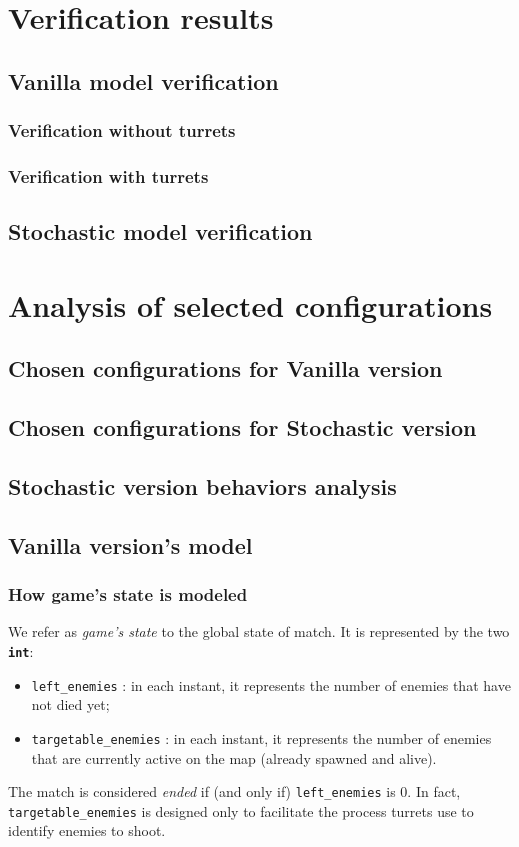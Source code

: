 \documentclass[
10pt, %
a4paper, %
oneside, %
headinclude,footinclude, %
BCOR5mm, %
]{scrartcl}
\begin{document}
	\section{Verification results}
		\subsection{Vanilla model verification}
			\subsubsection{Verification without turrets}
			\subsubsection{Verification with turrets}
		\subsection{Stochastic model verification}
	\section{Analysis of selected configurations}
		\subsection{Chosen configurations for Vanilla version}
		\subsection{Chosen configurations for Stochastic version}
		\subsection{Stochastic version behaviors analysis}
		
	\subsection{Vanilla version's model}
	\subsubsection{How game's state is modeled}
	We refer as \emph{game's state} to the global state of match. It is represented by the two \texttt{\textbf{int}}:
	\begin{itemize}
		\item \texttt{left\_enemies} : in each instant, it represents the number of enemies that have not died yet;
		\item \texttt{targetable\_enemies} : in each instant, it represents the number of enemies that are currently active on the map (already spawned and alive).
	\end{itemize}
	The match is considered \emph{ended} if (and only if) \texttt{left\_enemies} is 0. In fact, \texttt{targetable\_enemies} is designed only to facilitate the process turrets use to identify enemies to shoot.
	
\end{document}
